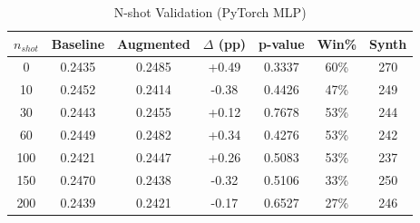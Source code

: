 \begin{table}[htbp]
\centering
\caption{N-shot Validation (PyTorch MLP)}
\label{tab:pytorch_nshot}
\begin{tabular}{ccccccc}
\toprule
$n_{shot}$ & Baseline & Augmented & $\Delta$ (pp) & p-value & Win\% & Synth \\
\midrule
0 & 0.2435 & 0.2485 & +0.49 & 0.3337 & 60\% & 270 \\
10 & 0.2452 & 0.2414 & -0.38 & 0.4426 & 47\% & 249 \\
30 & 0.2443 & 0.2455 & +0.12 & 0.7678 & 53\% & 244 \\
60 & 0.2449 & 0.2482 & +0.34 & 0.4276 & 53\% & 242 \\
100 & 0.2421 & 0.2447 & +0.26 & 0.5083 & 53\% & 237 \\
150 & 0.2470 & 0.2438 & -0.32 & 0.5106 & 33\% & 250 \\
200 & 0.2439 & 0.2421 & -0.17 & 0.6527 & 27\% & 246 \\
\bottomrule
\end{tabular}
\end{table}